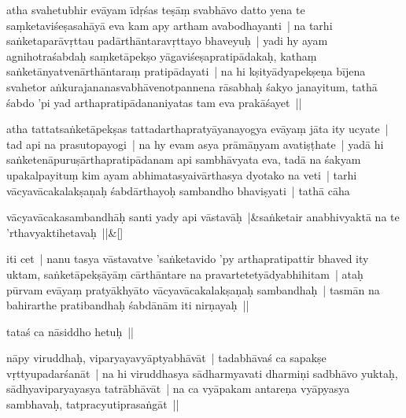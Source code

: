 \documentclass[article,12pt,a4paper]{memoir}%
\newcounter{parCount}
\begin{document}
	  \pstart \leavevmode%
	\label{thakur75-100.22}atha svahetubhir evāyam īdṛśas teṣāṃ svabhāvo datto yena te saṃketaviśeṣasahāyā eva kam apy artham avabodhayanti | na tarhi saṅketaparāvṛttau padārthāntaravṛttayo bhaveyuḥ | yadi hy ayam agnihotraśabdaḥ saṃketāpekṣo yāgaviśeṣapratipādakaḥ, kathaṃ saṅketānyatvenārthāntaraṃ pratipādayati | na hi kṣityādyapekṣeṇa bījena svahetor aṅkurajananasvabhāvenotpannena rāsabhaḥ śakyo janayitum, tathā śabdo 'pi yad arthapratipādananiyatas tam eva prakāśayet || 
	{}
	\pend%
      

	  \pstart \leavevmode%
	\label{thakur75-100.27}atha tattatsaṅketāpekṣas tattadarthapratyāyanayogya evāyaṃ jāta ity ucyate | tad api na prasutopayogi | na hy evam asya prāmāṇyam avatiṣṭhate | yadā hi saṅketenāpuruṣārthapratipādanam api sambhāvyata eva, tadā na śakyam upakalpayituṃ kim ayam abhimatasyaivārthasya dyotako na veti | tarhi vācyavācakalakṣaṇaḥ śabdārthayoḥ sambandho bhaviṣyati | tathā cāha
	{}
	\pend%
      
	    
	    \stanza[\smallbreak]
	  vācyavācakasambandhāḥ santi yady api vāstavāḥ |&saṅketair anabhivyaktā na te 'rthavyaktihetavaḥ ||\&[\smallbreak]
	  
	  
	  

	  \pstart \leavevmode%
	iti cet | nanu tasya vāstavatve 'saṅketavido 'py arthapratipattir bhaved ity uktam, saṅketāpekṣāyāṃ cārthāntare na pravartetetyādyabhihitam | ataḥ pūrvam evāyaṃ pratyākhyāto vācyavācakalakṣaṇaḥ sambandhaḥ | tasmān na bahirarthe pratibandhaḥ śabdānām iti nirṇayaḥ ||
	{}
	\pend%
      

	  \pstart \leavevmode%
	tataś ca nāsiddho hetuḥ ||
	{}
	\pend%
      

	  \pstart \leavevmode%
	\label{thakur75-101.6}nāpy viruddhaḥ, viparyayavyāptyabhāvāt | tadabhāvaś ca sapakṣe vṛttyupadarśanāt | na hi viruddhasya sādharmyavati dharmiṇi sadbhāvo yuktaḥ, sādhyaviparyayasya tatrābhāvāt | na ca vyāpakam antareṇa vyāpyasya sambhavaḥ, tatpracyutiprasaṅgāt || 
	{}
	\pend%
      
\end{document}
